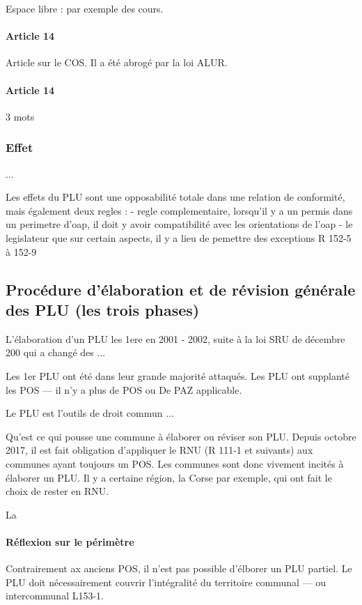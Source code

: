 			Espace libre : par exemple des cours.
			
			\paragraph{Article 14} Article sur le COS. Il a été abrogé par la loi ALUR.
			
			\paragraph{Article 14} 3 mots
			
		\subsubsection{Effet } ... 
		
		Les effets du PLU sont une opposabilité totale dans une relation de conformité, mais également deux regles :
			- regle complementaire, lorsqu'il y a un permis dans un perimetre d'oap, il doit y avoir compatibilité avec les orientations de l'oap
			- le legislateur que sur certain aspects, il y a lieu de pemettre des exceptions R 152-5 à 152-9
	
	\subsection{Procédure d'élaboration et de révision générale des PLU (les trois phases)}
	
		L'élaboration d'un PLU les 1ere en 2001 - 2002, suite à la loi SRU de décembre 200 qui a changé des ...
		
		Les 1er PLU ont été dans leur grande majorité attaqués. Les PLU ont supplanté les POS --- il n'y a plus de POS ou De PAZ applicable.
		
		Le PLU est l'outils de droit commun ...
		
		Qu'est ce qui pousse une commune à élaborer ou réviser son PLU. Depuis octobre 2017, il est fait obligation d'appliquer le RNU (R 111-1 et suivants) aux communes ayant toujours un POS. Les communes sont donc vivement incités à élaborer un PLU. Il y a certaine région, la Corse par exemple,  qui ont fait le choix de rester en RNU.
		
		La 
		
		\paragraph{Réflexion sur le périmètre} Contrairement ax anciens POS, il n'est pas possible d'élborer un PLU partiel. Le PLU doit nécessairement couvrir l'intégralité du territoire communal --- ou intercommunal L153-1.
		
